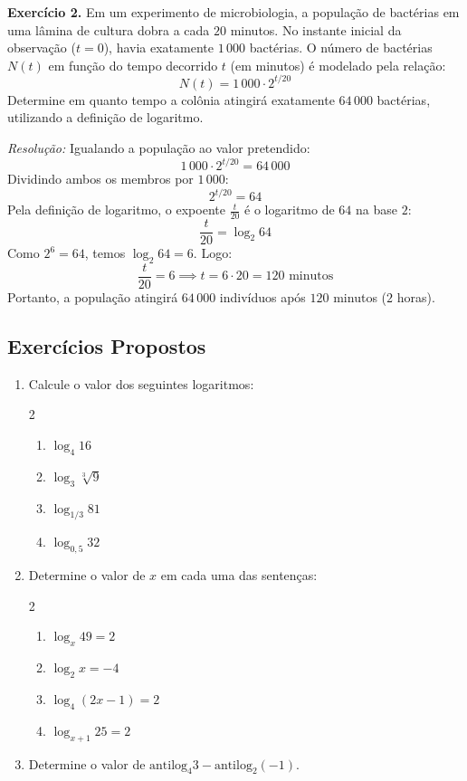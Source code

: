 \documentclass[12pt,a4paper]{report}
\begin{document}
	\textbf{Exercício 2.} Em um experimento de microbiologia, a população de bactérias em uma lâmina de cultura dobra a cada $20$ minutos. No instante inicial da observação ($t = 0$), havia exatamente $1\,000$ bactérias. O número de bactérias $N(t)$ em função do tempo decorrido $t$ (em minutos) é modelado pela relação:
	$$N(t) = 1\,000 \cdot 2^{t/20}$$
	Determine em quanto tempo a colônia atingirá exatamente $64\,000$ bactérias, utilizando a definição de logaritmo.
	
	\textit{Resolução:}
	Igualando a população ao valor pretendido:
	$$1\,000 \cdot 2^{t/20} = 64\,000$$
	Dividindo ambos os membros por $1\,000$:
	$$2^{t/20} = 64$$
	Pela definição de logaritmo, o expoente $\frac{t}{20}$ é o logaritmo de $64$ na base $2$:
	$$\frac{t}{20} = \log_2 64$$
	Como $2^6 = 64$, temos $\log_2 64 = 6$. Logo:
	$$\frac{t}{20} = 6 \implies t = 6 \cdot 20 = 120\text{ minutos}$$
	Portanto, a população atingirá $64\,000$ indivíduos após $120$ minutos ($2$ horas).
	
	\subsection*{Exercícios Propostos}
	
	\begin{enumerate}
		\item Calcule o valor dos seguintes logaritmos:
		\begin{multicols}{2}
			\begin{enumerate}[label=\textbf{\alph*)}]
				\item $\log_4 16$
				\item $\log_3 \sqrt[3]{9}$
				\item $\log_{1/3} 81$
				\item $\log_{0{,}5} 32$
			\end{enumerate}
		\end{multicols}
		
		\item Determine o valor de $x$ em cada uma das sentenças:
		\begin{multicols}{2}
			\begin{enumerate}[label=\textbf{\alph*)}]
				\item $\log_x 49 = 2$
				\item $\log_2 x = -4$
				\item $\log_4 (2x - 1) = 2$
				\item $\log_{x+1} 25 = 2$
			\end{enumerate}
		\end{multicols}
		
		\item Determine o valor de $\text{antilog}_4 3 - \text{antilog}_2 (-1)$.
	\end{enumerate}
	
\end{document}
